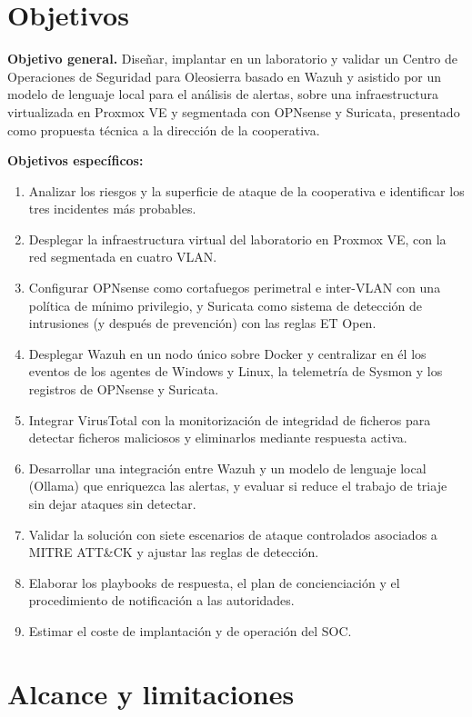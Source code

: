 \documentclass[11pt,a4paper,oneside]{report}
\begin{document}
\section{Objetivos}

\textbf{Objetivo general.} Diseñar, implantar en un laboratorio y validar un Centro de Operaciones de Seguridad para Oleosierra basado en Wazuh y asistido por un modelo de lenguaje local para el análisis de alertas, sobre una infraestructura virtualizada en Proxmox VE y segmentada con OPNsense y Suricata, presentado como propuesta técnica a la dirección de la cooperativa.

\textbf{Objetivos específicos:}
\begin{enumerate}[label=\textcolor{acento}{\ttfamily\small\bfseries OE\arabic*}, leftmargin=3.2em]
  \item Analizar los riesgos y la superficie de ataque de la cooperativa e identificar los tres incidentes más probables.
  \item Desplegar la infraestructura virtual del laboratorio en Proxmox VE, con la red segmentada en cuatro VLAN.
  \item Configurar OPNsense como cortafuegos perimetral e inter-VLAN con una política de mínimo privilegio, y Suricata como sistema de detección de intrusiones (y después de prevención) con las reglas ET Open.
  \item Desplegar Wazuh en un nodo único sobre Docker y centralizar en él los eventos de los agentes de Windows y Linux, la telemetría de Sysmon y los registros de OPNsense y Suricata.
  \item Integrar VirusTotal con la monitorización de integridad de ficheros para detectar ficheros maliciosos y eliminarlos mediante respuesta activa.
  \item Desarrollar una integración entre Wazuh y un modelo de lenguaje local (Ollama) que enriquezca las alertas, y evaluar si reduce el trabajo de triaje sin dejar ataques sin detectar.
  \item Validar la solución con siete escenarios de ataque controlados asociados a MITRE ATT\&CK y ajustar las reglas de detección.
  \item Elaborar los playbooks de respuesta, el plan de concienciación y el procedimiento de notificación a las autoridades.
  \item Estimar el coste de implantación y de operación del SOC.
\end{enumerate}

\section{Alcance y limitaciones}
\end{document}
